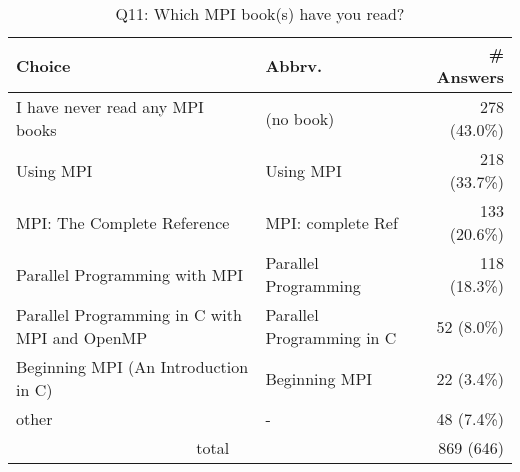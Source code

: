\begin{table}[htb]%
\begin{center}%
\caption{Q11: Which MPI book(s) have you read?}%
\label{tab:Q11-ans}%
\begin{tabular}{l|l|r}%
\hline%
Choice & Abbrv. & \# Answers \\%
\hline%
I have never read any MPI books & (no book) & 278 (43.0\%) \\%
Using MPI & Using MPI & 218 (33.7\%) \\%
MPI: The Complete Reference & MPI: complete Ref & 133 (20.6\%) \\%
Parallel Programming with MPI & Parallel Programming & 118 (18.3\%) \\%
{\small Parallel Programming in C with MPI and OpenMP} & Parallel Programming in C & 52 (8.0\%) \\%
Beginning MPI (An Introduction in C) & Beginning MPI & 22 (3.4\%) \\%
other & - & 48 (7.4\%) \\%
\hline%
\multicolumn{2}{c}{total} & 869 (646)\\%
\hline%
\end{tabular}%
\end{center}%
\end{table}%
